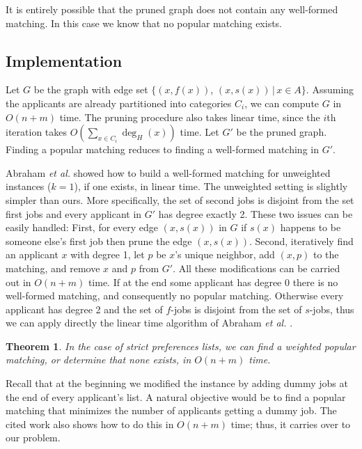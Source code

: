 \documentclass[11pt]{article}
\newcommand{\A}{A}
\newcommand{\first}{f}
\newcommand{\second}{s}
\newcommand{\etal} {{\it et al. }}
\newtheorem{theorem}{Theorem}
\begin{document}
It is entirely possible that the pruned graph does not contain any well-formed matching. In this case we know that no popular matching exists.

\subsection{Implementation}

Let $G$ be the graph with edge set $\{ (x, \first(x))$, $(x, \second(x)) \, |\, x \in \A \}$. Assuming the applicants are already partitioned into categories $C_i$, we can compute $G$ in $O(n+m)$ time. The pruning procedure also takes linear time, since the $i$th iteration takes $O\left(\sum_{x \in C_i} \deg_H(x)\right)$ time. Let $G'$ be the pruned graph. Finding a popular matching reduces to finding a well-formed matching in $G'$.

Abraham \etal \cite{AIKM05} showed how to build a well-formed matching for unweighted instances ($k=1$), if one exists, in linear time. The unweighted setting is slightly simpler than ours. More specifically, the set of second jobs is disjoint from the set first jobs and every applicant in $G'$ has degree exactly 2. These two issues can be easily handled: First, for every edge $(x,\second(x))$ in $G$ if $s(x)$ happens to be someone else's first job then prune the edge $(x,s(x))$. Second, iteratively find an applicant $x$ with degree 1, let $p$ be $x$'s unique neighbor, add $(x,p)$ to the matching, and remove $x$ and $p$ from $G'$. All these modifications can be carried out in $O(n+m)$ time. If at the end some applicant has degree 0 there is no well-formed matching, and consequently no popular matching. Otherwise every applicant has degree 2 and the set of $f$-jobs is disjoint from the set of $s$-jobs, thus we can apply directly the linear time algorithm of Abraham \etal \cite{AIKM05}.

\begin{theorem} In the case of strict preferences lists, we can find a weighted popular matching, or determine that none exists, in $O(n + m)$ time. \label{theorem:strict}
\end{theorem}

Recall that at the beginning we modified the instance by adding dummy jobs at the end of every applicant's list. A natural objective would be to find a popular matching that minimizes the number of applicants getting a dummy job. The cited work also shows how to do this in $O(n+m)$ time; thus, it carries over to our problem.
\end{document}
